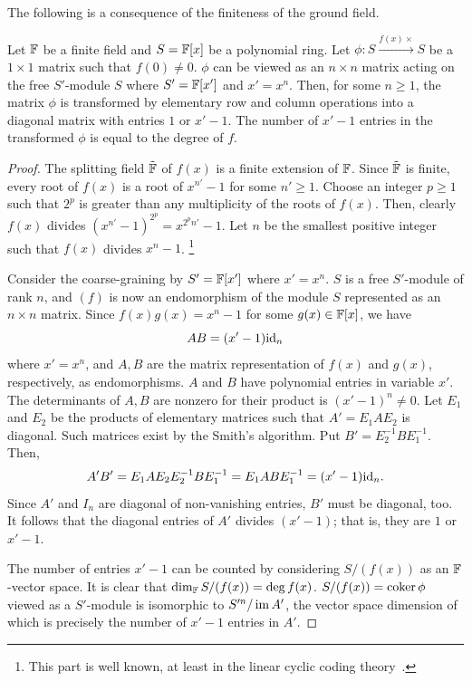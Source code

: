 The following is a consequence of the finiteness of the ground field.
\begin{lem}
Let $\mathbb{F}$ be a finite field and $S = \mathbb{F}[x]$ be a polynomial ring.
Let $\phi : S \xrightarrow{f(x) \times} S$ be a $1 \times 1$ matrix such that $f(0) \ne 0$.
$\phi$ can be viewed as an $n \times n$ matrix acting on the free $S'$-module $S$
where $S' = \mathbb{F}[x']$ and $x' =x^n$.
Then, for some $n \ge 1$, the matrix $\phi$ is transformed by elementary row and column operations
into a diagonal matrix with entries $1$ or $x'-1$.
The number of $x'-1$ entries in the transformed $\phi$ is equal to the degree of $f$.
\label{lem:coarse-graining-single-polynomial-in-1D}
\end{lem}
\begin{proof}
The splitting field $\tilde {\mathbb{F}}$ of $f(x)$ is a finite extension of $\mathbb{F}$.
Since $\tilde {\mathbb{F}}$ is finite, every root of $f(x)$ is a root of $x^{n'} -1$ for some $n' \ge 1$.
Choose an integer $p \ge 1$ such that $2^p$ is greater than any multiplicity of the roots of $f(x)$.
Then, clearly $f(x)$ divides $(x^{n'}-1)^{2^p} = x^{2^p n'} - 1$.
Let $n$ be the smallest positive integer such that $f(x)$ divides $x^n-1$.%
\footnote{This part is well known, at least in the linear cyclic coding theory~\cite{MacWilliamsSloane1977}.}

Consider the coarse-graining by $S' = \mathbb{F}[x']$ where $x'=x^n$.
$S$ is a free $S'$-module of rank $n$, and $(f)$ is now an endomorphism of the module $S$
represented as an $n \times n$ matrix.
Since $f(x)g(x) = x^n -1$ for some $g(x) \in \mathbb{F}[x]$,
we have
\[
 A B = (x'-1) \mathrm{id}_n
\]
where $x' = x^n$, and $A, B$ are the matrix representation of $f(x)$ and $g(x)$, respectively, as endomorphisms.
$A$ and $B$ have polynomial entries in variable $x'$.
The determinants of $A,B$ are nonzero for their product is $(x'-1)^n \ne 0$.
Let $E_1$ and $E_2$ be the products of elementary matrices such that $A' = E_1 A E_2$ is diagonal.
Such matrices exist by the Smith's algorithm.
Put $B' = E_2^{-1} B E_1^{-1}$.
Then,
\[
 A' B' = E_1 A E_2 E_2^{-1} B E_1^{-1} = E_1 A B E_1^{-1} = (x'-1)\mathrm{id}_n .
\]
Since $A'$ and $I_n$ are diagonal of non-vanishing entries, $B'$ must be diagonal, too.
It follows that the diagonal entries of $A'$ divides $(x'-1)$; that is, they are $1$ or $x'-1$.

The number of entries $x'-1$ can be counted by considering $S/(f(x))$ as an $\mathbb{F}$-vector space.
It is clear that $\dim_{\mathbb{F}} S/(f(x)) = \deg f(x)$.
$S/(f(x)) = \mathop{\mathrm{coker}}\nolimits \phi$ viewed as a $S'$-module is isomorphic to $S'^n / \mathop{\mathrm{im}}\nolimits A'$,
the vector space dimension of which is precisely the number of $x'-1$ entries in $A'$.
\end{proof}

